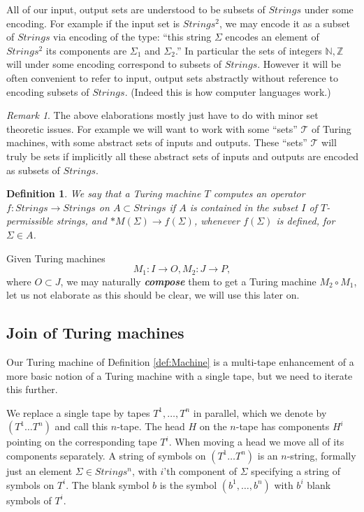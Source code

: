 \documentclass[9pt,twocolumn,twoside,lineno]{pnas-new}
\numberwithin{equation}{section}
\newtheorem{definition}[equation]{Definition}
\theoremstyle{definition}
\theoremstyle{remark}
\newtheorem{remark}{Remark}
\begin{document}
All of our input, output sets are understood to be subsets of $Strings$ under some encoding. For example if the input set is $Strings ^{2} $, we may encode it as a subset of $Strings$ via encoding of the type: ``this string $\Sigma$ encodes an element of $Strings ^{2} $ its components are $\Sigma _{1}$ and $\Sigma _{2}  $.'' 
In particular the sets of integers $\mathbb{N}, \mathbb{Z}$ 
will under some encoding correspond to subsets of $Strings$. However it will be often convenient to refer to input, output sets abstractly without reference to encoding subsets of $Strings$. (Indeed this is how computer languages work.) \begin{remark} The above elaborations mostly just have to do with minor set theoretic issues. For example we will want to work with some ``sets'' $\mathcal{T}$ of Turing machines, with some abstract sets of inputs and outputs. These ``sets'' $\mathcal{T}$ will truly be sets if implicitly all these abstract sets of inputs and outputs are encoded as subsets of $Strings$. \end{remark}
\begin{definition}  We say that a Turing machine $T$ computes an operator
$f: Strings \to Strings$  on $A \subset Strings$ if $A$ is contained in the subset $I$ of $T$-permissible strings, and $*M (\Sigma) \to f (\Sigma)$,  whenever $f (\Sigma)$ is defined, for $\Sigma \in A$.
\end{definition} 

Given Turing machines $$M _{1}: {I} \to {O}, M _{2}: {J} \to {P},$$ where ${O} \subset {J}$, we may naturally \textbf{\emph{compose}} them to get a Turing machine $M_2 \circ M _{1} $, let us not elaborate as this should be clear, we will use this later on.
\subsection {Join of Turing machines}
Our Turing machine of Definition \ref{def:Machine} is a multi-tape enhancement of a more basic notion of a Turing machine with a single tape,
but we need to iterate this further.  

We replace a single tape by tapes $T ^{1}, \ldots, T ^{n}  $
in parallel, which we denote by $(T ^{1} \ldots T ^{n})$ and call this $n$-tape.
The head $H$ on the $n$-tape has components $H ^{i} $ pointing on the corresponding tape $T ^{i} $. When moving a head we move all of its components separately. A string of symbols on $(T ^{1} \ldots T ^{n})$ is an $n$-string, 
formally just an element $\Sigma \in Strings ^{n} $, with $i$'th component of $\Sigma$
specifying a string of symbols on $T ^{i} $. The blank symbol $b$ is the symbol $(b ^{1}, \ldots, b ^{n} )$  with  $b ^{i} $ blank symbols of $T ^{i} $.
\end{document}
